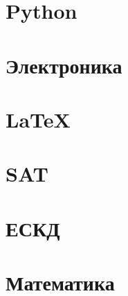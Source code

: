 \documentclass[oneside,12pt]{article}
\newcommand{\py}{Python}
\begin{document}
\section{\py}
\cite{pyotkidach,pythink}

\section{Электроника}
\cite{bcollis}

\section{\LaTeX}
\cite{ebooktex,bibiso,lvovsky}

\section{SAT} 
\cite{geektimes240554,VangliSAT}

\section{ЕСКД}
\cite{
gost2701, gost2702, gost2703, gost2704, gost2705, gost2708, gost2709, gost2710,
gost2711, gost2721, gost2722, gost2723, gost2725, gost2726, gost2727, gost2728,
gost2829, gost2730, gost2731, gost2732, gost2733, gost2734, gost2735, gost2736,
gost2737, gost2741, gost2742, gost2743, gost2744, gost2745, gost2746, gost2747,
gost2751, gost2755, gost2756, gost2758, gost2759, gost2761, gost2762}

\section{Математика}

\cite{maxphis}

\printbibliography
\end{document}
